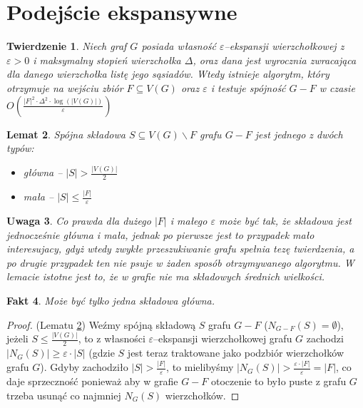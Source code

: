 \documentclass{pracamgr}
\newtheorem{theorem}{Twierdzenie}[chapter]
\newtheorem{lemma}[theorem]{Lemat}
\newtheorem{remark}[theorem]{Uwaga}
\newtheorem{fact}[theorem]{Fakt}
\begin{document}
  \section{Podejście ekspansywne}\label{podejscie ekspansywne}
   \begin{theorem}\label{Spójność ekspansywna}
    Niech graf $G$ posiada własność $\varepsilon$--ekspansji wierzchołkowej z $\varepsilon>0$ i maksymalny stopień wierzchołka $\Delta$,
    oraz dana jest wyrocznia zwracająca dla danego wierzchołka listę jego sąsiadów.
    Wtedy istnieje algorytm, który otrzymuje na wejściu zbiór $F\subseteq V(G)$ oraz $\varepsilon$
    i testuje spójność $G-F$ w czasie $O\left(\frac{|F|^2\cdot\Delta^2\cdot\log(|V(G)|)}{\varepsilon}\right)$
   \end{theorem}
   \begin{lemma}\label{klasyfikacja skladowych}
    Spójna składowa $S\subseteq V(G)\backslash F$ grafu $G-F$ jest jednego z dwóch typów:
    \begin{itemize}
     \item główna -- $|S|>\frac{|V(G)|}{2}$
     \item mała -- $|S|\le\frac{|F|}{\varepsilon}$
    \end{itemize}
   \end{lemma}
   \begin{remark}\label{klasyfikacja skladowych 2}
    Co prawda dla dużego $|F|$ i małego $\varepsilon$ może być tak, że składowa jest jednocześnie główna i mała, jednak po pierwsze jest to przypadek mało
    interesujacy, gdyż wtedy zwykłe przeszukiwanie grafu spełnia tezę twierdzenia, a po drugie przypadek ten nie psuje w żaden sposób otrzymywanego algorytmu.
    W lemacie istotne jest to, że w grafie nie ma składowych średnich wielkości.
   \end{remark}
   \begin{fact}\label{jedna glowna skladowa}
    Może być tylko jedna składowa główna.
   \end{fact}
   \begin{proof}
    (Lematu \ref{klasyfikacja skladowych})\newline
    Weźmy spójną składową $S$ grafu $G-F$ ($N_{G-F}(S)=\emptyset$), jeżeli $S\le\frac{|V(G)|}{2}$, to z własności $\varepsilon$--ekspansji wierzchołkowej grafu $G$
    zachodzi $|N_G(S)|\ge\varepsilon\cdot|S|$ (gdzie $S$ jest teraz traktowane jako podzbiór wierzchołków grafu $G$). Gdyby zachodziło $|S|>\frac{|F|}{\varepsilon}$,
    to mielibyśmy $|N_G(S)|>\frac{\varepsilon\cdot|F|}{\varepsilon}=|F|$, co daje sprzeczność ponieważ aby w grafie $G-F$ otoczenie to było puste z grafu
    $G$ trzeba usunąć co najmniej $N_G(S)$ wierzchołków.
   \end{proof}
\end{document}
